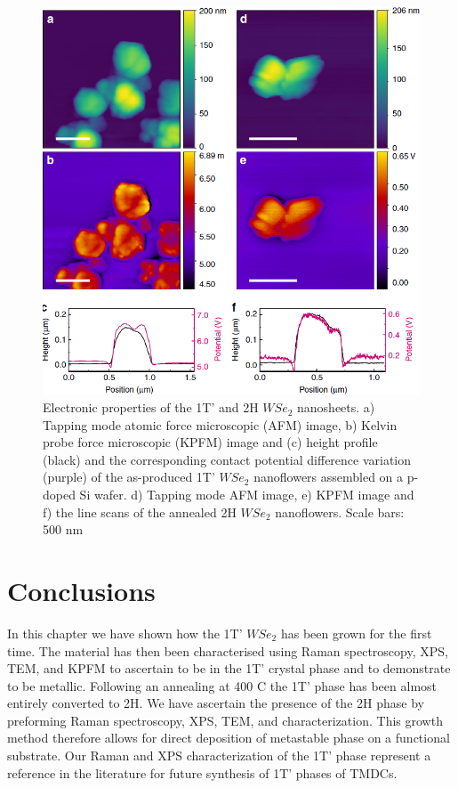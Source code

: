 \begin{figure}[!h]
	\begin{center}
		\includegraphics[scale=0.3]{1T'/ElectronicProperties.png}
		\caption{Electronic properties of the 1T’ and 2H $WSe_2$ nanosheets. a) Tapping mode atomic force microscopic (AFM) image, b) Kelvin probe force microscopic (KPFM) image and (c) height profile (black) and the corresponding contact potential difference variation (purple) of the as-produced 1T’ $WSe_2$ nanoflowers assembled on a p-doped Si wafer. d) Tapping mode AFM image, e) KPFM image and f) the line scans of the annealed 2H $WSe_2$ nanoflowers. Scale bars: 500 nm}
		\label{fig:1T'ElectronicProperties}
	\end{center}
\end{figure}

\section{Conclusions}

In this chapter we have shown how the 1T' $WSe_2$ has been grown for the first time. The material has then been characterised using Raman spectroscopy, XPS, TEM, and KPFM to ascertain to be in the 1T’ crystal phase and to demonstrate  to be metallic. Following an annealing at 400 {\degree}C the 1T' phase has been almost entirely converted to 2H. We have ascertain the presence of the 2H phase by preforming Raman spectroscopy, XPS, TEM, and characterization. This growth method therefore allows for direct deposition of metastable phase on a functional substrate. Our Raman and XPS characterization of the 1T’ phase represent a reference in the literature for future synthesis of 1T’ phases of TMDCs.